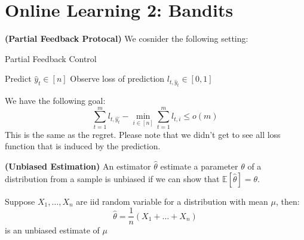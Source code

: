 \section{Online Learning 2: Bandits}

\begin{definition}{\textbf{(Partial Feedback Protocal)}}
    We cosnider the following setting:
    \begin{algorithm}[H]
        \caption{Partial Feedback Control}
        \begin{algorithmic}[1]
                \State Predict $\hat{y}_t \in [n]$
                \State Observe loss of prediction $l_{t, \hat{y}_t}\in[0, 1]$
            \EndFor
        \end{algorithmic} 
    \end{algorithm}
    We have the following goal:
    \begin{equation*}
        \sum^m_{t=1}l_{t, \hat{y_t}} - \min_{i\in[n]}\sum^m_{t=1}l_{t, i} \le o(m)
    \end{equation*}
    This is the same as the regret. Please note that we didn't get to see all loss function that is induced by the prediction.
\end{definition}

\begin{definition}{\textbf{(Unbiased Estimation)}}
    An estimator $\hat{\theta}$  estimate a parameter $\theta$ of a distribution from a sample is unbiased if we can show that $\mathbb{E}[\hat{\theta}] = \theta$.
\end{definition}

\begin{example}
    Suppose $X_1,\dots,X_n$ are iid random variable for a distribution with mean $\mu$, then:
    \begin{equation*}
        \hat{\theta} = \frac{1}{n}(X_1+\dots+X_n)
    \end{equation*}
    is an unbiased estimate of $\mu$
\end{example}

